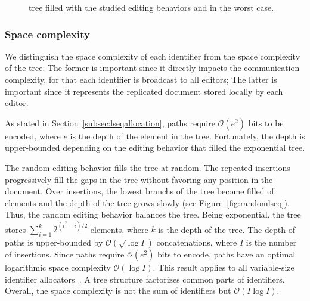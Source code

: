 \begin{figure}
  \centering
  \hspace{5pt}
  \hspace{5pt}
  \caption{\label{fig:complexity} \LSEQ tree filled with the studied editing
    behaviors and in the worst case.}
\end{figure}


\subsubsection{Space complexity}

We distinguish the space complexity of each identifier from the space complexity
of the tree. The former is important since it directly impacts the communication
complexity, for that each identifier is broadcast to all editors; The latter is
important since it represents the replicated document stored locally by each
editor.

As stated in Section~\ref{subsec:lseqallocation}, paths
require $\mathcal{O}(e^2)$ bits to be encoded,
where $e$ is the depth of the element in the tree. Fortunately, the depth is
upper-bounded depending on the editing behavior that filled the exponential
tree.

The random editing behavior fills the tree at random. The repeated insertions
progressively fill the gaps in the tree without favoring any position in the
document. Over insertions, the lowest branchs of the tree become filled of
elements and the depth of the tree grows slowly (see
Figure~\ref{fig:randomlseq}). Thus, the random editing behavior balances the
tree. Being exponential, the tree stores
$\textstyle\sum\nolimits_{i=1}^{k}{2^{(i^2-i)/2}}$ elements, where $k$ is the
depth of the tree. The depth of paths is upper-bounded by
$\mathcal{O}(\sqrt{\log I})$ concatenations, where $I$ is the number of
insertions. Since paths require $\mathcal{O}(e^2)$ bits to encode, paths have an
optimal logarithmic space complexity $\mathcal{O}(\log I)$. This result applies
to all variable-size identifier allocators~\cite{preguica2009commutative,
  weiss2009logoot}. A tree structure factorizes common parts of
identifiers. Overall, the space complexity is not the sum of identifiers but
$\mathcal{O}(I\log I)$.

